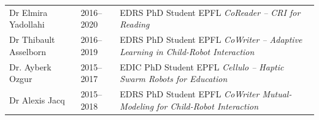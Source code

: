 \begin{tabularx}{\textwidth}{@{}llX@{}}
Dr Elmira Yadollahi     & 2016--2020      & EDRS PhD Student EPFL \quad \textit{CoReader -- CRI for Reading} \\[2pt]
Dr Thibault Asselborn   & 2016--2019      & EDRS PhD Student EPFL \quad \textit{CoWriter -- Adaptive Learning in Child-Robot Interaction} \\[2pt]
Dr. Ayberk Ozgur        & 2015--2017      & EDIC PhD Student EPFL \quad \textit{Cellulo -- Haptic Swarm Robots for Education} \\[2pt]
Dr Alexis Jacq          & 2015--2018      & EDRS PhD Student EPFL \quad \textit{CoWriter Mutual-Modeling for Child-Robot Interaction} \\
\end{tabularx}

